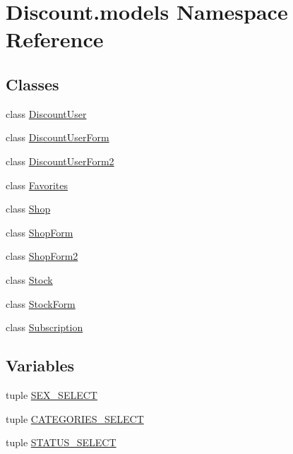 \hypertarget{namespace_discount_1_1models}{}\section{Discount.\+models Namespace Reference}
\label{namespace_discount_1_1models}
\subsection*{Classes}
\begin{DoxyCompactItemize}
\item 
class \hyperlink{class_discount_1_1models_1_1_discount_user}{Discount\+User}
\item 
class \hyperlink{class_discount_1_1models_1_1_discount_user_form}{Discount\+User\+Form}
\item 
class \hyperlink{class_discount_1_1models_1_1_discount_user_form2}{Discount\+User\+Form2}
\item 
class \hyperlink{class_discount_1_1models_1_1_favorites}{Favorites}
\item 
class \hyperlink{class_discount_1_1models_1_1_shop}{Shop}
\item 
class \hyperlink{class_discount_1_1models_1_1_shop_form}{Shop\+Form}
\item 
class \hyperlink{class_discount_1_1models_1_1_shop_form2}{Shop\+Form2}
\item 
class \hyperlink{class_discount_1_1models_1_1_stock}{Stock}
\item 
class \hyperlink{class_discount_1_1models_1_1_stock_form}{Stock\+Form}
\item 
class \hyperlink{class_discount_1_1models_1_1_subscription}{Subscription}
\end{DoxyCompactItemize}
\subsection*{Variables}
\begin{DoxyCompactItemize}
\item 
tuple \hyperlink{namespace_discount_1_1models_a9696923b818a8cfb7e050ee4a8413053}{S\+E\+X\+\_\+\+S\+E\+L\+E\+CT}
\item 
tuple \hyperlink{namespace_discount_1_1models_a125399ca6dffacd93430a3418d3f39bb}{C\+A\+T\+E\+G\+O\+R\+I\+E\+S\+\_\+\+S\+E\+L\+E\+CT}
\item 
tuple \hyperlink{namespace_discount_1_1models_a8d71c5509c24914255117f46069cb170}{S\+T\+A\+T\+U\+S\+\_\+\+S\+E\+L\+E\+CT}
\end{DoxyCompactItemize}


